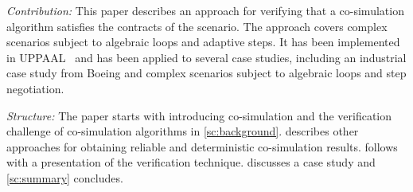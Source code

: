 \textit{Contribution:}
This paper describes an approach for verifying that a co-simulation algorithm satisfies the contracts of the scenario. The approach covers complex scenarios subject to algebraic loops and adaptive steps.
It has been implemented in UPPAAL~\cite{behrmann_uppaal_2006} and has been applied to several case studies, including an industrial case study from Boeing \cite{Gomes2019a} and complex scenarios subject to algebraic loops and step negotiation.

\textit{Structure:}
The paper starts with introducing co-simulation and the verification challenge of co-simulation algorithms in \cref{sc:background}.  describes other approaches for obtaining reliable and deterministic co-simulation results.  follows with a presentation of the verification technique.  discusses a case study and \cref{sc:summary} concludes.